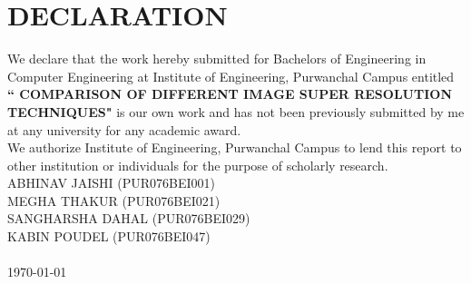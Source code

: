 \newpage
{}
\section*{DECLARATION}
We declare that the work hereby submitted for Bachelors of Engineering in Computer Engineering at Institute of Engineering, Purwanchal Campus entitled \textbf{`` COMPARISON OF DIFFERENT IMAGE SUPER RESOLUTION TECHNIQUES"} is our own work and has not been previously submitted by me at any university for any academic award.\\
We authorize Institute of Engineering, Purwanchal Campus to lend this report to other institution or individuals for the purpose of scholarly research.
\vspace{1cm}\\
ABHINAV JAISHI (PUR076BEI001)\\
MEGHA THAKUR (PUR076BEI021)\\
SANGHARSHA DAHAL (PUR076BEI029)\\
KABIN POUDEL (PUR076BEI047)\\
\\
\today